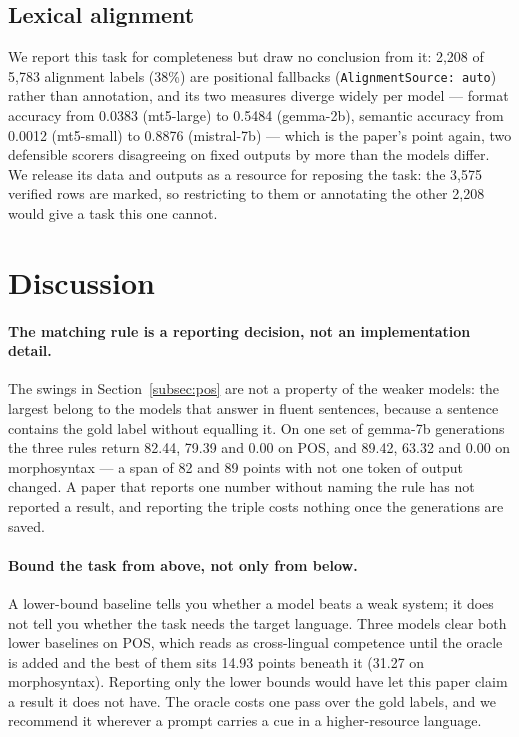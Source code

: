 \documentclass[11pt]{article}
\begin{document}
\subsection{Lexical alignment}
\label{subsec:alignment}

We report this task for completeness but draw no conclusion from it: 2,208
of 5,783 alignment labels (38\%) are positional fallbacks
(\texttt{AlignmentSource: auto}) rather than annotation, and its two
measures diverge widely per model --- format accuracy from 0.0383
(mt5-large) to 0.5484 (gemma-2b), semantic accuracy from 0.0012 (mt5-small)
to 0.8876 (mistral-7b) --- which is the paper's point again, two defensible
scorers disagreeing on fixed outputs by more than the models differ. We
release its data and outputs as a resource for reposing the task: the 3,575
verified rows are marked, so restricting to them or annotating the other
2,208 would give a task this one cannot.

\section{Discussion}
\label{sec:discussion}

\paragraph{The matching rule is a reporting decision, not an implementation
detail.} The swings in Section~\ref{subsec:pos} are not a property of the
weaker models: the largest belong to the models that answer in fluent
sentences, because a sentence contains the gold label without equalling it.
On one set of gemma-7b generations the three rules return 82.44, 79.39 and
0.00 on POS, and 89.42, 63.32 and 0.00 on morphosyntax --- a span of 82 and
89 points with not one token of output changed. A paper that reports one
number without naming the rule has not reported a result, and reporting the
triple costs nothing once the generations are saved.

\paragraph{Bound the task from above, not only from below.} A lower-bound
baseline tells you whether a model beats a weak system; it does not tell you
whether the task needs the target language. Three models clear both lower
baselines on POS, which reads as cross-lingual competence until the oracle is
added and the best of them sits 14.93 points beneath it (31.27 on
morphosyntax). Reporting only the lower bounds would have let this paper
claim a result it does not have. The oracle costs one pass over the gold
labels, and we recommend it wherever a prompt carries a cue in a
higher-resource language.
\end{document}
